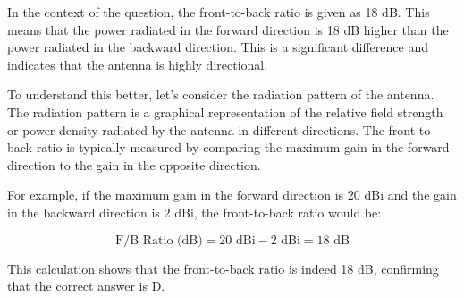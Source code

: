 In the context of the question, the front-to-back ratio is given as 18 dB. This means that the power radiated in the forward direction is 18 dB higher than the power radiated in the backward direction. This is a significant difference and indicates that the antenna is highly directional.

To understand this better, let's consider the radiation pattern of the antenna. The radiation pattern is a graphical representation of the relative field strength or power density radiated by the antenna in different directions. The front-to-back ratio is typically measured by comparing the maximum gain in the forward direction to the gain in the opposite direction.

For example, if the maximum gain in the forward direction is 20 dBi and the gain in the backward direction is 2 dBi, the front-to-back ratio would be:

\[
\text{F/B Ratio (dB)} = 20 \text{ dBi} - 2 \text{ dBi} = 18 \text{ dB}
\]

This calculation shows that the front-to-back ratio is indeed 18 dB, confirming that the correct answer is D.

